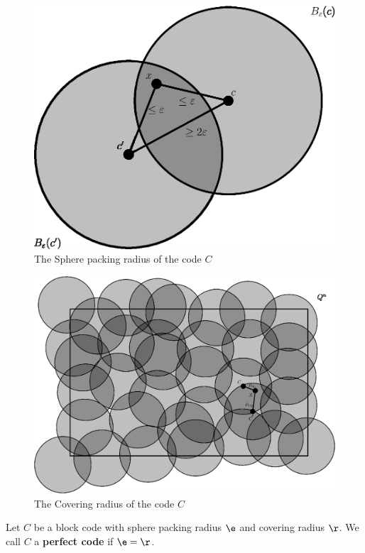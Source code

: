 \begin{figure}[h]
  \centering
  \includegraphics[scale=0.5]{Figures/Chapter1/sphere_packing.eps}
  \caption{The Sphere packing radius of the code $C$}
  \label{figure_1.1}
\end{figure}

\begin{figure}[h]
  \centering
  \includegraphics[scale=0.5]{Figures/Chapter1/covering_radius.eps}
  \caption{The Covering radius of the code $C$}
  \label{figure_1.1}
\end{figure}

\begin{definition}
  Let $C$ be a block code with sphere packing radius  $\e$ and covering radius
  $\r$. We call  $C$ a  \textbf{perfect code} if $\e=\r$.
\end{definition}

